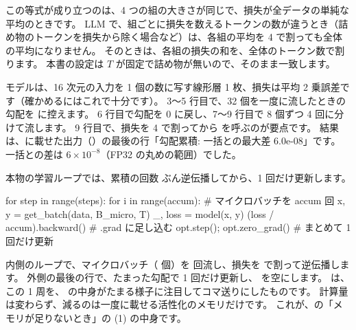 この等式が成り立つのは、4 つの組の大きさが同じで、損失が全データの単純な平均のときです。
LLM で、組ごとに損失を数えるトークンの数が違うとき（詰め物のトークンを損失から除く場合など）は、各組の平均を 4 で割っても全体の平均になりません。
そのときは、各組の損失の和を、全体のトークン数で割ります。
本書の設定は $T$ が固定で詰め物が無いので、そのまま一致します。


モデルは、16 次元の入力を 1 個の数に写す線形層 1 枚、損失は平均 2 乗誤差です（確かめるにはこれで十分です）。
3〜5 行目で、32 個を一度に流したときの勾配を  に控えます。
6 行目で勾配を 0 に戻し、7〜9 行目で 8 個ずつ 4 回に分けて流します。
9 行目で、損失を 4 で割ってから  を呼ぶのが要点です。
結果は、に載せた出力（）の最後の行「勾配累積: 一括との最大差 6.0e-08」です。
一括との差は $6\times10^{-8}$（FP32 の丸めの範囲）でした。

本物の学習ループでは、累積の回数  ぶん逆伝播してから、1 回だけ更新します。

\begin{pycode}
for step in range(steps):
    for i in range(accum):                 # マイクロバッチを accum 回
        x, y = get_batch(data, B_micro, T)
        _, loss = model(x, y)
        (loss / accum).backward()          # .grad に足し込む
    opt.step(); opt.zero_grad()            # まとめて 1 回だけ更新
\end{pycode}
内側のループで、マイクロバッチ（ 個）を  回流し、損失を  で割って逆伝播します。
外側の最後の行で、たまった勾配で 1 回だけ更新し、 を空にします。
は、この 1 周を、 の中身がたまる様子に注目してコマ送りにしたものです。
計算量は変わらず、減るのは一度に載せる活性化のメモリだけです。
これが、の「メモリが足りないとき」の (1) の中身です。

